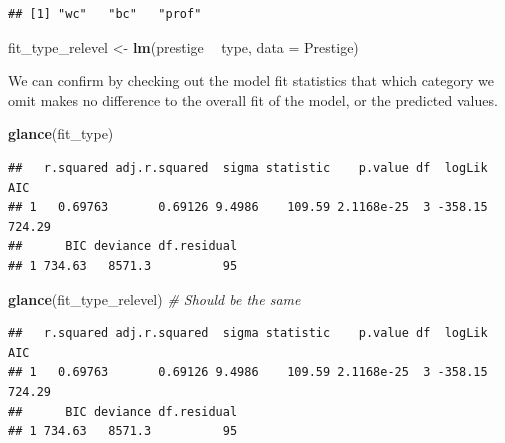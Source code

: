 \documentclass[12pt,oneside,openany]{book}
\newenvironment{Shaded}{\begin{snugshade}}{\end{snugshade}}
\newcommand{\KeywordTok}[1]{\textcolor[rgb]{0.13,0.29,0.53}{\textbf{#1}}}
\newcommand{\DataTypeTok}[1]{\textcolor[rgb]{0.13,0.29,0.53}{#1}}
\newcommand{\StringTok}[1]{\textcolor[rgb]{0.31,0.60,0.02}{#1}}
\newcommand{\CommentTok}[1]{\textcolor[rgb]{0.56,0.35,0.01}{\textit{#1}}}
\newcommand{\OperatorTok}[1]{\textcolor[rgb]{0.81,0.36,0.00}{\textbf{#1}}}
\newcommand{\NormalTok}[1]{#1}
\begin{document}
\begin{Shaded}
\end{Shaded}

\begin{verbatim}
## [1] "wc"   "bc"   "prof"
\end{verbatim}

\begin{Shaded}
\begin{Highlighting}[]
\NormalTok{fit_type_relevel <-}\StringTok{ }\KeywordTok{lm}\NormalTok{(prestige }\OperatorTok{~}\StringTok{ }\NormalTok{type, }\DataTypeTok{data =}\NormalTok{ Prestige)}
\end{Highlighting}
\end{Shaded}

We can confirm by checking out the model fit statistics that which
category we omit makes no difference to the overall fit of the model, or
the predicted values.

\begin{Shaded}
\begin{Highlighting}[]
\KeywordTok{glance}\NormalTok{(fit_type)}
\end{Highlighting}
\end{Shaded}

\begin{verbatim}
##   r.squared adj.r.squared  sigma statistic    p.value df  logLik    AIC
## 1   0.69763       0.69126 9.4986    109.59 2.1168e-25  3 -358.15 724.29
##      BIC deviance df.residual
## 1 734.63   8571.3          95
\end{verbatim}

\begin{Shaded}
\begin{Highlighting}[]
\KeywordTok{glance}\NormalTok{(fit_type_relevel)  }\CommentTok{# Should be the same}
\end{Highlighting}
\end{Shaded}

\begin{verbatim}
##   r.squared adj.r.squared  sigma statistic    p.value df  logLik    AIC
## 1   0.69763       0.69126 9.4986    109.59 2.1168e-25  3 -358.15 724.29
##      BIC deviance df.residual
## 1 734.63   8571.3          95
\end{verbatim}
\end{document}
